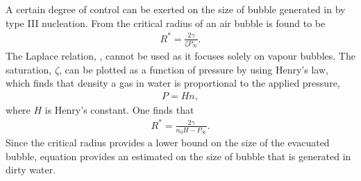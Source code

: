 A certain degree of control can be exerted on the size of bubble generated in by type III nucleation.
From  the critical radius of an air bubble is found to be
\begin{align}
  R^\ast = \frac{2 \gamma}{\zeta P_\infty}.
\label{eqn:nuc:astarTwo}
\end{align}
The Laplace relation, , cannot be used as it  focuses solely on vapour bubbles.
The saturation, $\zeta$, can be plotted as a function of pressure by using Henry's law,
which finds that density a gas in water is proportional to the applied pressure,
\begin{align}
  P = H n,
\end{align}
where $H$ is Henry's constant.  One finds that 
\begin{align}
  R^\ast = \frac{2\gamma}{n_0H - P_\infty}.
\end{align}
Since the critical radius provides a lower bound on the size of the evacuated bubble,
equation  provides an estimated on the size of bubble that is generated in dirty water.







%


